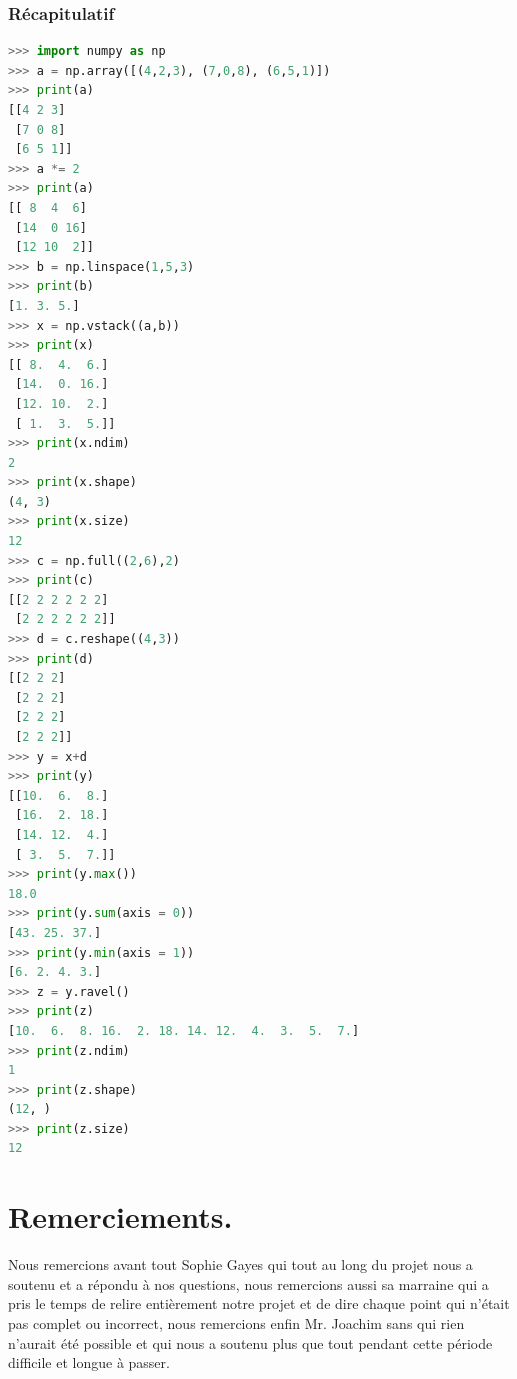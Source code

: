 \documentclass[a4paper, 12pt]{article}
\numberwithin{equation}{subsection}
\begin{document}
\subsubsection{Récapitulatif}
\begin{lstlisting}[language=Python]
>>> import numpy as np
>>> a = np.array([(4,2,3), (7,0,8), (6,5,1)])
>>> print(a)
[[4 2 3]
 [7 0 8]
 [6 5 1]]
>>> a *= 2
>>> print(a)
[[ 8  4  6]
 [14  0 16]
 [12 10  2]]
>>> b = np.linspace(1,5,3)
>>> print(b)
[1. 3. 5.]
>>> x = np.vstack((a,b))
>>> print(x)
[[ 8.  4.  6.]
 [14.  0. 16.]
 [12. 10.  2.]
 [ 1.  3.  5.]]
>>> print(x.ndim)
2
>>> print(x.shape)
(4, 3)
>>> print(x.size)
12
>>> c = np.full((2,6),2)
>>> print(c)
[[2 2 2 2 2 2]
 [2 2 2 2 2 2]]
>>> d = c.reshape((4,3))
>>> print(d)
[[2 2 2]
 [2 2 2]
 [2 2 2]
 [2 2 2]]
>>> y = x+d
>>> print(y)
[[10.  6.  8.]
 [16.  2. 18.]
 [14. 12.  4.]
 [ 3.  5.  7.]]
>>> print(y.max())
18.0
>>> print(y.sum(axis = 0))
[43. 25. 37.]
>>> print(y.min(axis = 1))
[6. 2. 4. 3.]
>>> z = y.ravel()
>>> print(z)
[10.  6.  8. 16.  2. 18. 14. 12.  4.  3.  5.  7.]
>>> print(z.ndim)
1
>>> print(z.shape)
(12, )
>>> print(z.size)
12
\end{lstlisting}
\newpage
\section{Remerciements.}

Nous remercions avant tout Sophie Gayes qui tout au long du projet nous a soutenu et a répondu à nos questions, nous remercions aussi sa marraine qui a pris le temps de relire entièrement notre projet et de dire chaque point qui n'était pas complet ou incorrect, nous remercions enfin Mr. Joachim sans qui rien n'aurait été possible et qui nous a soutenu plus que tout pendant cette période difficile et longue à passer.
\end{document}
